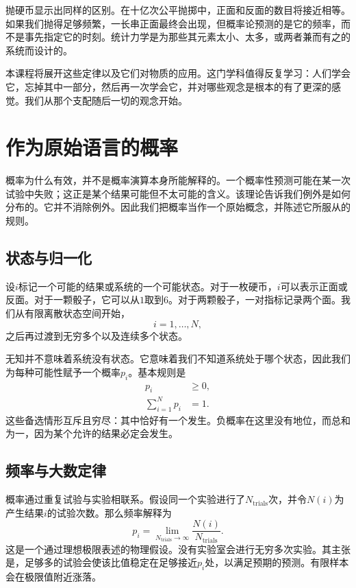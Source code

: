 抛硬币显示出同样的区别。在十亿次公平抛掷中，正面和反面的数目将接近相等。如果我们抛得足够频繁，一长串正面最终会出现，但概率论预测的是它的频率，而不是事先指定它的时刻。统计力学是为那些其元素太小、太多，或两者兼而有之的系统而设计的。

本课程将展开这些定律以及它们对物质的应用。这门学科值得反复学习：人们学会它，忘掉其中一部分，然后再一次学会它，并对哪些观念是根本的有了更深的感觉。我们从那个支配随后一切的观念开始。

\section{作为原始语言的概率}

概率为什么有效，并不是概率演算本身所能解释的。一个概率性预测可能在某一次试验中失败；这正是某个结果可能但不太可能的含义。该理论告诉我们例外是如何分布的。它并不消除例外。因此我们把概率当作一个原始概念，并陈述它所服从的规则。

\subsection{状态与归一化}

设\(i\)标记一个可能的结果或系统的一个可能状态。对于一枚硬币，\(i\)可以表示正面或反面。对于一颗骰子，它可以从\(1\)取到\(6\)。对于两颗骰子，一对指标记录两个面。我们从有限离散状态空间开始，
\begin{equation}
 i=1,\ldots,N,
\end{equation}
之后再过渡到无穷多个以及连续多个状态。

无知并不意味着系统没有状态。它意味着我们不知道系统处于哪个状态，因此我们为每种可能性赋予一个概率\(p_i\)。基本规则是
\begin{align}
 p_i &\geq 0, \label{eq:sm1-prob-positive}\\
 \sum_{i=1}^{N}p_i &=1. \label{eq:sm1-prob-normalization}
\end{align}
这些备选情形互斥且穷尽：其中恰好有一个发生。负概率在这里没有地位，而总和为一，因为某个允许的结果必定会发生。

\subsection{频率与大数定律}

概率通过重复试验与实验相联系。假设同一个实验进行了\(N_{\mathrm{trials}}\)次，并令\(N(i)\)为产生结果\(i\)的试验次数。那么频率解释为
\begin{equation}
 p_i=
 \lim_{N_{\mathrm{trials}}\to\infty}
 \frac{N(i)}{N_{\mathrm{trials}}}.
 \label{eq:sm1-frequency}
\end{equation}
这是一个通过理想极限表述的物理假设。没有实验室会进行无穷多次实验。其主张是，足够多的试验会使该比值稳定在足够接近\(p_i\)处，以满足预期的预测。有限样本会在极限值附近涨落。

